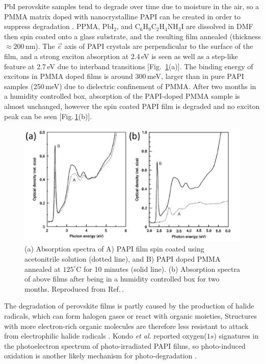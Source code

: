 PbI perovskite samples tend to degrade over time due to moisture in the air, so a PMMA matrix doped with nanocrystalline PAPI can be created in order to suppress degradation \cite{Kitazawa1998}. PPMA, Pb$\textrm{I}_2$, and $\textrm{C}_6\textrm{H}_9\textrm{C}_2\textrm{H}_4\textrm{NH}_3\textrm{I}$ are dissolved in DMF then spin coated onto a glass substrate, and the resulting film annealed (thickness $\approx200$\,nm). The $\vec{c}$ axis of PAPI crystals are perpendicular to the surface of the film, and a strong exciton absorption at 2.4\,eV is seen as well as a step-like feature at 2.7\,eV due to interband transitions [Fig.\ \ref{2Fig10}(a)]. The binding energy of excitons in PMMA doped films is around 300\,meV, larger than in pure PAPI samples (250\,meV) due to dielectric confinement of PMMA. After two months in a humidity controlled box, absorption of the PAPI-doped PMMA sample is almost unchanged, however the spin coated PAPI film is degraded and no exciton peak can be seen [Fig.\,\ref{2Fig10}(b)].
\begin{figure}
\centering
\includegraphics[width=\textwidth]{Fig10}
\caption{ (a) Absorption spectra of A) PAPI film spin coated using acetonitrile solution (dotted line), and B) PAPI doped PMMA annealed at $125^{\circ}$C for 10 minutes (solid line). (b) Absorption spectra of above films after being in a humidity controlled box for two months. Reproduced from Ref.\,\cite{Kitazawa1998}.}
\label{2Fig10}
\end{figure}

The degradation of perovskite films is partly caused by the production of halide radicals, which can form halogen gases or react with organic moieties, Structures with more electron-rich organic molecules are therefore less resistant to attack from electrophilic halide radicals \cite{Wei2014}. Kondo \textit{et al.} reported oxygen($1s$) signatures in the photoelectron spectrum of photo-irradiated PAPI films, so photo-induced oxidation is another likely mechanism for photo-degradation \cite{Kitazawa2002}.


